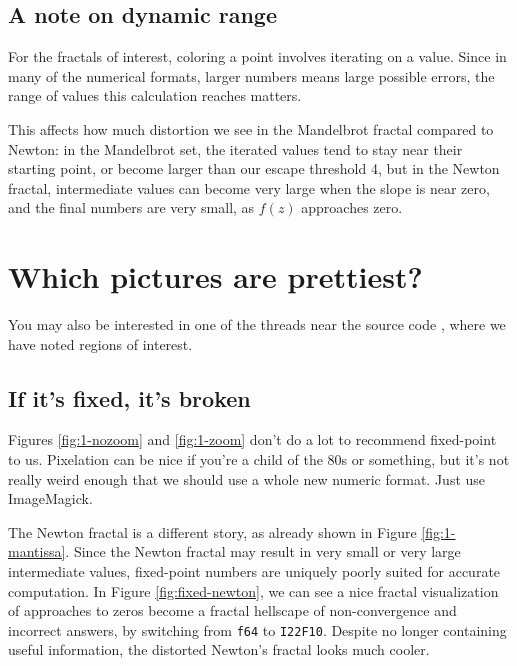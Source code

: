 \documentclass[sigconf,authorversion,nonacm]{acmart}
\begin{document}
\setcounter{subsection}{74}
\subsection{A note on dynamic range}
\label{hdr}

For the fractals of interest, coloring a point involves iterating on a value.
Since in many of the numerical formats, larger numbers means large possible errors,
the range of values this calculation reaches matters.

This affects how much distortion we see in the Mandelbrot fractal compared to 
Newton: in the Mandelbrot set, the iterated values tend to stay near their starting
point, or become larger than our escape threshold 4, but in the Newton
fractal, intermediate values can become very large when the slope is near zero,
and the final numbers are very small, as $f(z)$ approaches zero. 

\setcounter{section}{3}
\section{Which pictures are prettiest?}

You may also be interested in one of the threads near the source code \cite{github:thread},
where we have noted regions of interest.

\setcounter{subsection}{142578124}
\subsection{If it's fixed, it's broken}

Figures \ref{fig:1-nozoom} and \ref{fig:1-zoom} don't do a lot to recommend fixed-point to us.
Pixelation can be nice if you're a child of the 80s or something, but it's not really weird enough
that we should use a whole new numeric format. Just use ImageMagick. \cite{imagemagick} \cite{imagemagick:xkcd}

The Newton fractal is a different story, as already shown in Figure \ref{fig:1-mantissa}. Since the Newton fractal may result in very small or very
large intermediate values, fixed-point numbers are uniquely poorly suited
for accurate computation. In Figure \ref{fig:fixed-newton},
we can see a nice fractal visualization of approaches to zeros become a fractal hellscape of 
non-convergence and incorrect answers, by switching from \texttt{f64} to \texttt{I22F10}. 
Despite no longer containing useful information, the distorted Newton's fractal looks much cooler.
\end{document}
